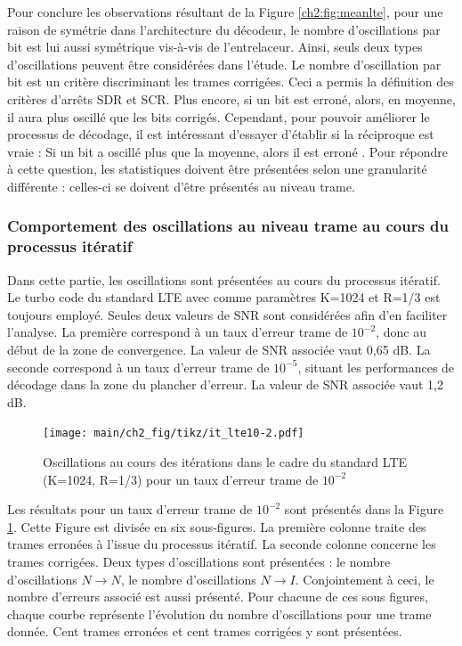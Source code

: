 Pour conclure les observations résultant de la Figure \ref{ch2:fig:meanlte}, pour une raison de symétrie dans l'architecture 
du décodeur, le nombre d'oscillations par bit est lui aussi symétrique vis-à-vis de l'entrelaceur. Ainsi, seuls deux types 
d'oscillations peuvent être considérées dans l'étude. Le nombre d’oscillation par bit est un critère discriminant les trames 
corrigées. Ceci a permis la définition des critères d'arrêts SDR et SCR. Plus encore, si un bit est erroné, alors, en moyenne, 
il aura plus oscillé que les bits corrigés. Cependant, pour pouvoir améliorer le processus de décodage, il est intéressant 
d'essayer d'établir si la réciproque est vraie : 
\og Si un bit a oscillé plus que la moyenne, alors il est erroné \fg. Pour répondre à cette question, les statistiques doivent
être présentées selon une granularité différente : celles-ci se doivent d'être présentés au niveau trame.

\subsubsection{Comportement des oscillations au niveau trame au cours du processus itératif} 
Dans cette partie, les oscillations sont présentées au cours du processus itératif. Le turbo code du standard LTE avec 
comme paramètres K=1024 et R=1/3 est toujours employé. Seules deux valeurs de SNR sont considérées afin d'en faciliter 
l'analyse. La première correspond à un taux d'erreur trame de $10^{-2}$, donc au début de la zone de convergence. La valeur 
de SNR associée vaut 0,65 dB. La seconde correspond à un taux d'erreur trame de $10^{-5}$, situant les performances de 
décodage dans la zone du plancher d'erreur. La valeur de SNR associée vaut 1,2 dB.

\begin{figure}[!ht]
	\hspace*{-.7cm}
	\begin{center}
	\texttt{[image: main/ch2\_fig/tikz/it\_lte10-2.pdf]}
	\caption{Oscillations au cours des itérations dans le cadre du standard LTE (K=1024, R=1/3) pour un taux d'erreur trame de $10^{-2}$ \label{ch2:fig:it_lte_1}}
	\end{center}
\end{figure}

Les résultats pour un taux d'erreur trame de $10^{-2}$ sont présentés dans la  Figure \ref{ch2:fig:it_lte_1}. Cette 
Figure est divisée en six sous-figures. La première colonne traite des trames erronées à l'issue du processus 
itératif. La seconde colonne concerne les trames corrigées. Deux types d'oscillations sont présentées : le nombre d'oscillations 
$N\rightarrow N$, le nombre d'oscillations $N\rightarrow I$. Conjointement à ceci, le nombre d'erreurs associé est aussi 
présenté. Pour chacune de ces sous figures, chaque courbe représente l'évolution du nombre d'oscillations
pour une trame donnée. Cent trames erronées et cent trames corrigées y sont présentées.

